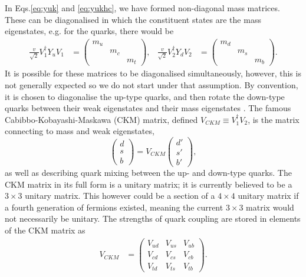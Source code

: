 \documentclass[a4paper,12pt]{article}
\begin{document}
In Eqs.\eqref{eq:yuk} and \eqref{eq:yukhc}, we have formed non-diagonal mass matrices. 
These can be diagonalised in which the constituent states are the mass eigenstates, e.g. for the quarks, there would be 
\begin{align}
    \label{eq:massmat}
    \frac{v}{\sqrt{2}}V_1^\dagger Y_uV_1 &= \begin{pmatrix} m_u & & \\ & m_c & \\ & & m_t\end{pmatrix}, & \frac{v}{\sqrt{2}}V_2^\dagger Y_dV_2 &= \begin{pmatrix} m_d & & \\ & m_s & \\ & & m_b\end{pmatrix}.
\end{align}
It is possible for these matrices to be diagonalised simultaneously, however, this is not generally expected so we do not start under that assumption. 
By convention, it is chosen to diagonalise the up-type quarks, and then rotate the down-type quarks between their weak eigenstates and their mass eigenstates \cite{dono}. 
The famous Cabibbo-Kobayashi-Maskawa (CKM) matrix, defined $V_{CKM}\equiv V_1^\dagger V_2$, is the matrix connecting to mass and weak eigenstates,
\begin{equation}
    \label{eq:ckmone}
    \begin{pmatrix} d \\ s \\ b\end{pmatrix} = V_{CKM}\begin{pmatrix} d' \\ s' \\ b'\end{pmatrix},
\end{equation}
as well as describing quark mixing between the up- and down-type quarks. 
The CKM matrix in its full form is a unitary matrix; it is currently believed to be a $3\times3$ unitary matrix. 
This however could be a section of a $4\times4$ unitary matrix if a fourth generation of fermions existed, meaning the current $3\times3$ matrix would not necessarily be unitary. 
The strengths of quark coupling are stored in elements of the CKM matrix as
\begin{align}
    \label{eq:ckmub}
    V_{CKM} &= \begin{pmatrix}V_{ud}&V_{us}&V_{ub}\\V_{cd}&V_{cs}&V_{cb}\\V_{td}&V_{ts}&V_{tb}\end{pmatrix}.
\end{align}
\end{document}

